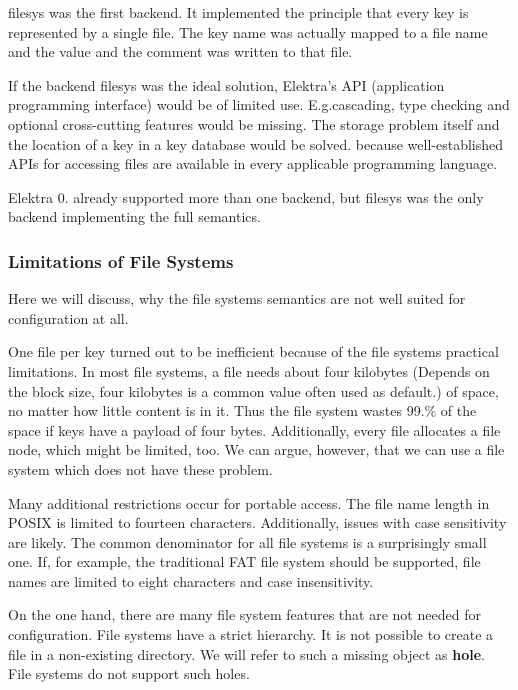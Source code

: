 {\ttfamily filesys} was the first backend. It implemented the principle that every key is represented by a single file. The key name was actually mapped to a file name and the value and the comment was written to that file.

If the backend {\ttfamily filesys} was the ideal solution, Elektra’s A\+PI (application programming interface) would be of limited use. E.\+g.\+cascading, type checking and optional cross-\/cutting features would be missing. The storage problem itself and the location of a key in a key database would be solved. because well-\/established A\+P\+Is for accessing files are available in every applicable programming language.

Elektra 0. already supported more than one backend, but {\ttfamily filesys} was the only backend implementing the full semantics.

\subsubsection*{Limitations of File Systems}

Here we will discuss, why the file system\textquotesingle{}s semantics are not well suited for configuration at all.

One file per key turned out to be inefficient because of the file system\textquotesingle{}s practical limitations. In most file systems, a file needs about four kilobytes (Depends on the block size, four kilobytes is a common value often used as default.) of space, no matter how little content is in it. Thus the file system wastes 99.\% of the space if keys have a payload of four bytes. Additionally, every file allocates a file node, which might be limited, too. We can argue, however, that we can use a file system which does not have these problem.

Many additional restrictions occur for portable access. The file name length in P\+O\+S\+IX is limited to fourteen characters. Additionally, issues with case sensitivity are likely. The common denominator for all file systems is a surprisingly small one. If, for example, the traditional F\+AT file system should be supported, file names are limited to eight characters and case insensitivity.

On the one hand, there are many file system features that are not needed for configuration. File systems have a strict hierarchy. It is not possible to create a file in a non-\/existing directory. We will refer to such a missing object as {\bfseries hole}. File systems do not support such holes.

